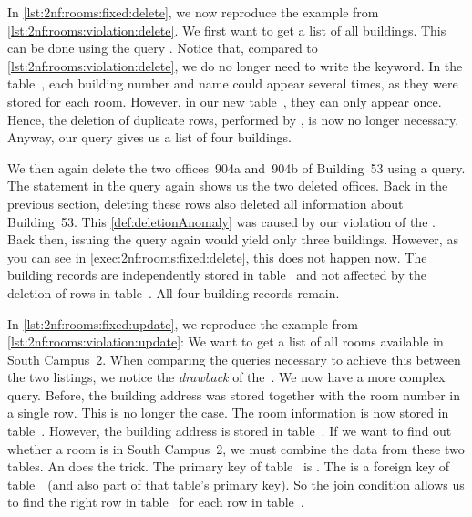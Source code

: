 In \cref{lst:2nf:rooms:fixed:delete}, we now reproduce the example from \cref{lst:2nf:rooms:violation:delete}.
We first want to get a list of all buildings.
This can be done using the query .
Notice that, compared to \cref{lst:2nf:rooms:violation:delete}, we do no longer need to write the  keyword.
In the table~, each building number and name could appear several times, as they were stored for each room.
However, in our new table~, they can only appear once.
Hence, the deletion of duplicate rows, performed by , is now no longer necessary.
Anyway, our query gives us a list of four buildings.

We then again delete the two offices~904a and~904b of Building~53 using a  query.
The  statement in the query again shows us the two deleted offices.
Back in the previous section, deleting these rows also deleted all information about Building~53.
This \cref{def:deletionAnomaly} was caused by our violation of the .
Back then, issuing the  query again would yield only three buildings.
However, as you can see in \cref{exec:2nf:rooms:fixed:delete}, this does not happen now.
The building records are independently stored in table~ and not affected by the deletion of rows in table~.
All four building records remain.

In \cref{lst:2nf:rooms:fixed:update}, we reproduce the example from \cref{lst:2nf:rooms:violation:update}:
We want to get a list of all rooms available in South Campus~2.
When comparing the queries necessary to achieve this between the two listings, we notice the \emph{drawback} of the~.
We now have a more complex query.
Before, the building address was stored together with the room number in a single row.
This is no longer the case.
The room information is now stored in table~.
However, the building address is stored in table~.
If we want to find out whether a room is in South Campus~2, we must combine the data from these two tables.
An  does the trick.
The primary key of table~ is .
The  is a foreign key of table~~(and also part of that table's primary key).
So the join condition  allows us to find the right row in table~ for each row in table~.

